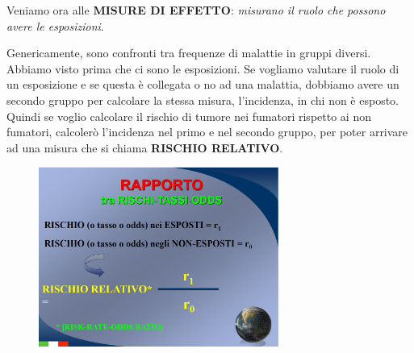 Veniamo ora alle \textbf{MISURE DI EFFETTO}: \emph{misurano il ruolo che
possono avere le esposizioni}.

Genericamente, sono confronti tra frequenze di malattie in gruppi
diversi. Abbiamo visto prima che ci sono le esposizioni. Se vogliamo
valutare il ruolo di un esposizione e se questa è collegata o no ad una
malattia, dobbiamo avere un secondo gruppo per calcolare la stessa
misura, l'incidenza, in chi non è esposto. Quindi se voglio calcolare il
rischio di tumore nei fumatori rispetto ai non fumatori, calcolerò
l'incidenza nel primo e nel secondo gruppo, per poter arrivare ad una
misura che si chiama \textbf{RISCHIO RELATIVO}.

\begin{figure}[!ht]
\centering
	\includegraphics[width=0.7\textwidth]{03/image15.png}
\end{figure}


